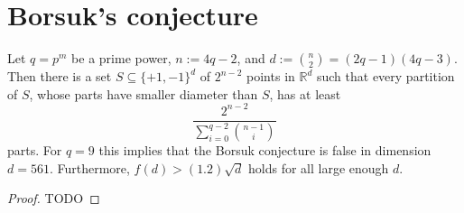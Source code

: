 \chapter{Borsuk's conjecture}

\begin{theorem}
  \label{borsuk_conjecture}
  Let $q = p^m$ be a prime power, $n := 4q - 2$, and $d := \binom{n}{2} = (2q - 1)(4q - 3)$.
  Then there is a set $S \subseteq \{+1, -1\}^d$ of $2^{n-2}$ points in $\mathbb{R}^d$
  such that every partition of $S$, whose parts have smaller diameter than $S$, has at least
  \[
  \frac{2^{n-2}}{\sum_{i=0}^{q-2} \binom{n-1}{i}}
  \]
  parts. For $q = 9$ this implies that the Borsuk conjecture is false in dimension $d = 561$.
  Furthermore, $f(d) > (1.2)\sqrt{d}$ holds for all large enough $d$.
\end{theorem}
\begin{proof}
  TODO
\end{proof}
